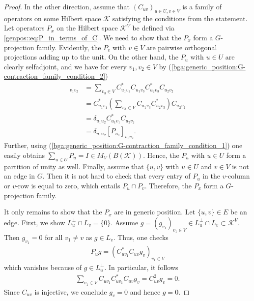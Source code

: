 \documentclass[a4paper]{amsart}
\begin{document}
\begin{proof}
    In the other direction, assume that $(C_{uv})_{u \in U, v \in V}$ is a family of operators on some Hilbert space $\mathcal{K}$ satisfying the conditions from the statement. Let operators $P_x$ on the Hilbert space $\mathcal{K}^V$ be defined via \eqref{genpos::eq:P_in_terms_of_C}. We need to show that the $P_x$ form a $G$-projection family. Evidently, the $P_v$ with $v \in V$ are pairwise orthogonal projections adding up to the unit. On the other hand, the $P_u$ with $u \in U$ are clearly selfadjoint, and we have for every $v_1, v_2 \in V$ by (\ref{bga:generic_position:G-contraction_family_condition_2})
    \begin{align*}
        [P_{u_1} P_{u_2}]_{v_1 v_2} &= \sum_{v_3 \in V} C_{u_1 v_1}^\ast C_{u_1 v_3} C_{u_2 v_3}^\ast C_{u_2 v_2} \\
            &= C_{u_1 v_1}^\ast \left( \sum_{v_3 \in V} C_{u_1 v_3} C_{u_2 v_3}^\ast \right) C_{u_2 v_2} \\
            &= \delta_{u_1 u_2} C_{u_1 v_1}^\ast C_{u_2 v_2} \\
            &= \delta_{u_1 u_2} [P_{u_1}]_{v_1 v_2}.
    \end{align*}
    Further, using (\ref{bga:generic_position:G-contraction_family_condition_1}) one easily obtains $\sum_{u \in U} P_u = I \in M_V(B(\mathcal{K}))$. Hence, the $P_u$ with $u \in U$ form a partition of unity as well. Finally, assume that $\{u, v \}$ with $u \in U$ and $v \in V$ is not an edge in $G$. Then it is not hard to check that every entry of $P_u$ in the $v$-column or $v$-row is equal to zero, which entails $P_u \cap P_v$. Therefore, the $P_x$ form a $G$-projection family. 

    It only remains to show that the $P_x$ are in generic position. Let $\{u,v\} \in E$ be an edge. First, we show $L_u^\perp \cap L_v = \{0\}$. Assume $g = (g_{v_1})_{v_1 \in V} \in L_u^\perp \cap L_v \subset \mathcal{K}^V$. Then $g_{v_1} = 0$ for all $v_1 \neq v$ as $g \in L_v$. Thus, one checks
    \begin{align*}
        P_u g = \left( C_{u v_1}^\ast C_{u v} g_v \right)_{v_1 \in V} 
    \end{align*}
    which vanishes because of $g \in L_u^\perp$. In particular, it follows
    \begin{align*}
        \sum_{v_1 \in V} C_{u v_1} C_{u v_1}^\ast C_{u v} g_v = C_{uv}^2 g_v = 0.
    \end{align*}
    Since $C_{uv}$ is injective, we conclude $g_v = 0$ and hence $g = 0$.


\end{proof}
\end{document}
